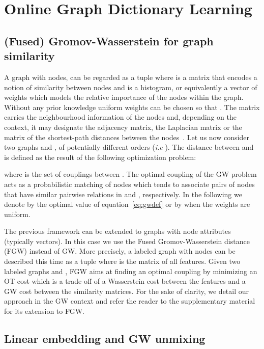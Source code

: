\documentclass{article}
\def\eqref#1{equation~\ref{#1}}
\begin{document}
	
	\section{Online Graph Dictionary Learning }
	
	\subsection{(Fused) Gromov-Wasserstein for graph similarity}
	\label{subsec:GW_all}
	A graph  with  nodes, can be regarded as a tuple  where  is a matrix that
	encodes a notion of similarity between nodes and  is
	a histogram, or equivalently a vector of weights  which models the relative importance of the nodes within the graph. Without any prior knowledge uniform weights can be chosen so that . The matrix  carries the neighbourhood information of the nodes and, depending on
	the context, it may designate the adjacency matrix, the Laplacian matrix \cite{maretic2019got} or the matrix of the shortest-path distances between the nodes~\citep{bavaud2010euclidean}. Let us now consider two graphs  and , {of potentially different orders (\emph{i.e} )}. The  distance between  and  is defined as the result of the following optimization problem:
	
	where  is the set of couplings between . 
	The optimal coupling  of the GW problem acts as a probabilistic matching of nodes which tends to associate pairs of nodes that have similar pairwise relations in  and , respectively. In the following we denote by  the optimal value of \eqref{eq:gwdef} or  by  when the weights are uniform.
	
	The previous framework can be extended to graphs with node attributes
	(typically  vectors). In this case we  use the Fused
	Gromov-Wasserstein distance (FGW) \cite{vayer-fused-2018,vayer-optimal-nodate}
	instead of GW. More precisely, a labeled graph  with  nodes can be
	described this time as a tuple  where  is the matrix of all features. Given two labeled graphs  and ,
	FGW aims at finding an optimal coupling by minimizing an OT cost which is a
	trade-off of a Wasserstein cost between the features and a GW cost between the
	similarity matrices. For the sake of clarity, we detail our approach in the GW context and refer the reader to the supplementary material for its extension to FGW.
	
	\subsection{Linear embedding and GW unmixing}\label{subsec:GU}
	
\end{document}
